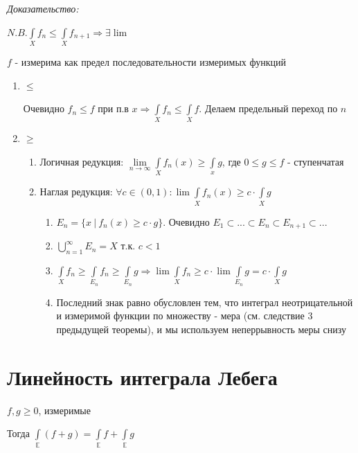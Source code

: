\documentclass[paper=a4, fontsize=17pt]{article}
\begin{document}
\emph{Доказательство:}

$N.B. \int\limits_{X}f_n \leqslant \int\limits_{X}f_{n+1} \Rightarrow \exists \lim$

$f$ - измерима как предел последовательности измеримых функций

\begin{enumerate}
	\item $\leqslant$

	Очевидно $f_n \leqslant f$ при п.в $x \Rightarrow \int\limits_{X}f_n \leqslant \int\limits_{X}f$. Делаем предельный переход по $n$

	\item $\geqslant$
		\begin{enumerate}
			\item Логичная редукция: $\lim\limits_{n \rightarrow \infty} \int\limits_{X}f_n(x) \geqslant \int\limits_{x}g$, где $0 \leqslant g \leqslant f$ - ступенчатая

			\item Наглая редукция: $\forall c \in (0,1): \lim\int\limits_{X}f_n(x) \geqslant c \cdot \int\limits_{X}g$
				\begin{enumerate}
					\item $E_n = \{x\ |\ f_n(x) \geqslant c \cdot g\}$. Очевидно $E_1 \subset ... \subset E_n \subset E_{n + 1} \subset ...$

					\item $\bigcup\limits_{n=1}^{\infty}E_n = X$ т.к. $c < 1$

					\item $\int\limits_{X}f_n \geqslant \int\limits_{E_n}f_n \geqslant \int\limits_{E_n}g \Rightarrow \lim \int\limits_{X}f_n \geqslant c \cdot \lim \int\limits_{E_n}g = c \cdot \int\limits_{X}g$

					\item Последний знак равно обусловлен тем, что интеграл неотрицательной и измеримой функции по множеству - мера (см. следствие 3 предыдущей теоремы), и мы используем неперрывность меры снизу
				\end{enumerate}
		\end{enumerate}
\end{enumerate}

\section{Линейность интеграла Лебега}

$f, g \geqslant 0$, измеримые

Тогда $\int\limits_{\mathds{E}} (f + g) = \int\limits_{\mathds{E}} f + \int\limits_{\mathds{E}} g$
\end{document}
